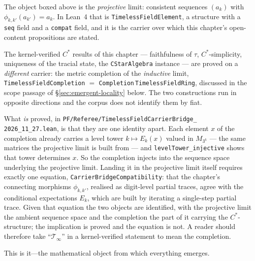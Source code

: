 \begin{remark}
\label{rem:two-carriers}
The object boxed above is the \emph{projective} limit: consistent sequences
$(a_k)$ with $\phi_{k,k'}(a_{k'}) = a_k$. In Lean~4 that is
\texttt{TimelessFieldElement}, a structure with a \texttt{seq} field and a
\texttt{compat} field, and it is the carrier over which this chapter's
open-content propositions are stated.

The kernel-verified $C^*$ results of this chapter --- faithfulness of $\tau$,
$C^*$-simplicity, uniqueness of the tracial state, the \texttt{CStarAlgebra}
instance --- are proved on a \emph{different} carrier: the metric completion
of the \emph{inductive} limit, \texttt{TimelessFieldCompletion}
$=$ \texttt{Completion}$\,$\texttt{TimelessFieldRing}, discussed in the scope
passage of \S\ref{sec:emergent-locality} below. The two constructions run
in opposite directions and the corpus does not identify them by fiat.

What \emph{is} proved, in
\texttt{PF/Referee/TimelessFieldCarrierBridge\_\\
2026\_11\_27.lean}, is that they are one identity apart. Each element $x$ of
the completion already carries a level tower $k \mapsto E_k(x)$ valued in
$M_{3^k}$ --- the same matrices the projective limit is built from --- and
\texttt{levelTower\_injective} shows that tower determines $x$. So the
completion injects into the sequence space underlying the projective limit.
Landing it in the projective limit itself requires exactly one equation,
\texttt{CarrierBridgeCompatibility}: that the chapter's connecting morphisms
$\phi_{k,k'}$, realised as digit-level partial traces, agree with the
conditional expectations $E_k$, which are built by iterating a single-step
partial trace. Given that equation the two objects are identified, with the
projective limit the ambient sequence space and the completion the part of it
carrying the $C^*$-structure; the implication is proved and the equation is
not. A reader should therefore take ``$\mathcal{T}_\infty$'' in a
kernel-verified statement to mean the completion.
\end{remark}

This is it—the mathematical object from which everything emerges.

